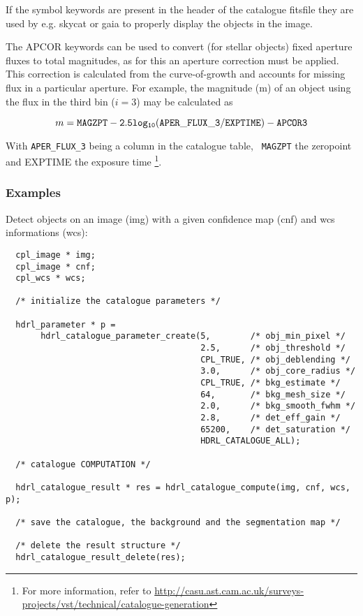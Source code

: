 If the symbol keywords are present in the header of the catalogue
fitsfile they are used by e.g. skycat or gaia to properly display the
objects in the image.

The APCOR keywords can be used to convert (for stellar objects) fixed
aperture fluxes to total magnitudes, as for this an aperture
correction must be applied. This correction is calculated from the
curve-of-growth and accounts for missing flux in a particular
aperture. For example, the magnitude (m) of an object using the flux
in the third bin ($i = 3$) may be calculated as

\begin{equation}
m = \tt{MAGZPT} - 2.5log_{10}(\tt{APER\_FLUX\_3/EXPTIME}) - \tt{APCOR3}
\end{equation}

With {\tt APER\_FLUX\_3} being a column in the catalogue table, {\tt
  MAGZPT} the zeropoint and EXPTIME the exposure time \footnote{For more information, refer to \url{http://casu.ast.cam.ac.uk/surveys-projects/vst/technical/catalogue-generation}}.




\subsubsection{Examples}

Detect objects on an image (img) with a given confidence map (cnf) and
wcs informations (wcs):


\begin{lstlisting}
  cpl_image * img;
  cpl_image * cnf;
  cpl_wcs * wcs;

  /* initialize the catalogue parameters */

  hdrl_parameter * p =  
       hdrl_catalogue_parameter_create(5,        /* obj_min_pixel */      
                                       2.5,      /* obj_threshold */     
                                       CPL_TRUE, /* obj_deblending */    
                                       3.0,      /* obj_core_radius */   
                                       CPL_TRUE, /* bkg_estimate */      
                                       64,       /* bkg_mesh_size */     
                                       2.0,      /* bkg_smooth_fwhm */   
                                       2.8,      /* det_eff_gain */      
                                       65200,    /* det_saturation */    
                                       HDRL_CATALOGUE_ALL);

  /* catalogue COMPUTATION */

  hdrl_catalogue_result * res = hdrl_catalogue_compute(img, cnf, wcs, p);

  /* save the catalogue, the background and the segmentation map */

  /* delete the result structure */
  hdrl_catalogue_result_delete(res);
\end{lstlisting}

